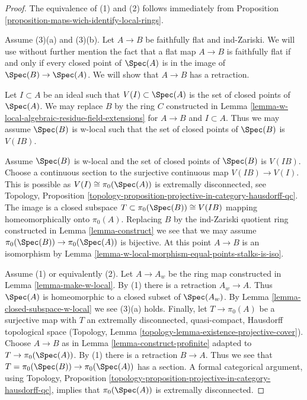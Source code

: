 \begin{proof}
The equivalence of (1) and (2) follows immediately from
Proposition \ref{proposition-maps-wich-identify-local-rings}.

\medskip\noindent
Assume (3)(a) and (3)(b). Let $A \to B$ be faithfully flat and ind-Zariski.
We will use without further mention the fact that a flat map
$A \to B$ is faithfully flat if and only if every closed point
of $\Spec(A)$ is in the image of $\Spec(B) \to \Spec(A)$.
We will show that $A \to B$ has a retraction.

\medskip\noindent
Let $I \subset A$ be an ideal such that $V(I) \subset \Spec(A)$ is
the set of closed points of $\Spec(A)$. 
We may replace $B$ by the ring $C$ constructed in
Lemma \ref{lemma-w-local-algebraic-residue-field-extensions}
for $A \to B$ and $I \subset A$.
Thus we may assume $\Spec(B)$ is w-local such that the set of
closed points of $\Spec(B)$ is $V(IB)$.

\medskip\noindent
Assume $\Spec(B)$ is w-local and the set of closed points of $\Spec(B)$
is $V(IB)$. Choose a continuous section to the surjective
continuous map $V(IB) \to V(I)$. This is possible as
$V(I) \cong \pi_0(\Spec(A))$ is extremally disconnected, see
Topology, Proposition
\ref{topology-proposition-projective-in-category-hausdorff-qc}.
The image is a closed subspace $T \subset \pi_0(\Spec(B)) \cong V(IB)$
mapping homeomorphically onto $\pi_0(A)$. Replacing $B$ by the ind-Zariski
quotient ring constructed in Lemma \ref{lemma-construct}
we see that we may assume $\pi_0(\Spec(B)) \to \pi_0(\Spec(A))$
is bijective. At this point $A \to B$ is an isomorphism by
Lemma \ref{lemma-w-local-morphism-equal-points-stalks-is-iso}.

\medskip\noindent
Assume (1) or equivalently (2). Let $A \to A_w$ be the ring map constructed in
Lemma \ref{lemma-make-w-local}. By (1) there is a retraction $A_w \to A$.
Thus $\Spec(A)$ is homeomorphic to a closed subset of $\Spec(A_w)$. By
Lemma \ref{lemma-closed-subspace-w-local} we see (3)(a) holds.
Finally, let $T \to \pi_0(A)$ be a surjective map with $T$ an
extremally disconnected, quasi-compact, Hausdorff topological space
(Topology, Lemma \ref{topology-lemma-existence-projective-cover}).
Choose $A \to B$ as in Lemma \ref{lemma-construct-profinite}
adapted to $T \to \pi_0(\Spec(A))$. By (1) there is a retraction
$B \to A$. Thus we see that $T = \pi_0(\Spec(B)) \to \pi_0(\Spec(A))$
has a section. A formal categorical argument, using
Topology, Proposition
\ref{topology-proposition-projective-in-category-hausdorff-qc},
implies that $\pi_0(\Spec(A))$ is extremally disconnected.
\end{proof}

